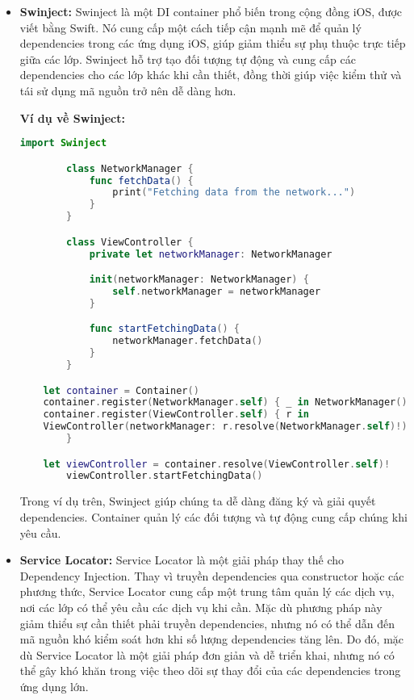     \begin{itemize}
      \item \textbf{Swinject:} Swinject là một DI container phổ biến trong cộng đồng iOS, được viết bằng Swift. Nó cung cấp một cách tiếp cận mạnh mẽ để quản lý dependencies trong các ứng dụng iOS, giúp giảm thiểu sự phụ thuộc trực tiếp giữa các lớp. Swinject hỗ trợ tạo đối tượng tự động và cung cấp các dependencies cho các lớp khác khi cần thiết, đồng thời giúp việc kiểm thử và tái sử dụng mã nguồn trở nên dễ dàng hơn.

      \textbf{Ví dụ về Swinject:}
      \begin{lstlisting}[language=Swift]
        import Swinject

        class NetworkManager {
            func fetchData() {
                print("Fetching data from the network...")
            }
        }

        class ViewController {
            private let networkManager: NetworkManager

            init(networkManager: NetworkManager) {
                self.networkManager = networkManager
            }

            func startFetchingData() {
                networkManager.fetchData()
            }
        }

    let container = Container()
    container.register(NetworkManager.self) { _ in NetworkManager() }
    container.register(ViewController.self) { r in
    ViewController(networkManager: r.resolve(NetworkManager.self)!)
        }

    let viewController = container.resolve(ViewController.self)!
        viewController.startFetchingData()
      \end{lstlisting}
      Trong ví dụ trên, Swinject giúp chúng ta dễ dàng đăng ký và giải quyết dependencies. Container quản lý các đối tượng và tự động cung cấp chúng khi yêu cầu.

      \item \textbf{Service Locator:} Service Locator là một giải pháp thay thế cho Dependency Injection. Thay vì truyền dependencies qua constructor hoặc các phương thức, Service Locator cung cấp một trung tâm quản lý các dịch vụ, nơi các lớp có thể yêu cầu các dịch vụ khi cần. Mặc dù phương pháp này giảm thiểu sự cần thiết phải truyền dependencies, nhưng nó có thể dẫn đến mã nguồn khó kiểm soát hơn khi số lượng dependencies tăng lên. Do đó, mặc dù Service Locator là một giải pháp đơn giản và dễ triển khai, nhưng nó có thể gây khó khăn trong việc theo dõi sự thay đổi của các dependencies trong ứng dụng lớn.


\end{itemize}

